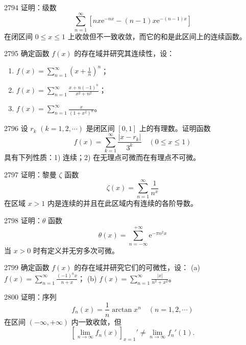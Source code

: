 \begin{prob}[M]{2794}
证明：级数
\[
\sum_{n=1}^{\infty} \left[ nx\mathrm{e}^{-nx} - (n-1)x\mathrm{e}^{-(n-1)x} \right]
\]
在闭区间 $0 \leqslant x \leqslant 1$ 上收敛但不一致收敛，而它的和是此区间上的连续函数。
\end{prob}

\begin{prob}[L]{2795}
确定函数 $f(x)$ 的存在域并研究其连续性，设：
\begin{enumerate}[label=(\alph*), itemsep=2pt, topsep=3pt]
  \item $\displaystyle f(x) = \sum_{n=1}^{\infty} \left(x + \frac{1}{n}\right)^n$；
  \item $\displaystyle f(x) = \sum_{n=1}^{\infty} \frac{x + n(-1)^n}{x^2 + n^2}$；
  \item $\displaystyle f(x) = \sum_{n=1}^{\infty} \frac{x}{(1 + x^2)^n}$。
\end{enumerate}
\end{prob}

\begin{prob}[M]{2796}
设 $r_k$ $(k=1,2,\cdots)$ 是闭区间 $[0,1]$ 上的有理数。证明函数
\[
f(x) = \sum_{k=1}^{\infty} \frac{|x - r_k|}{3^k} \quad (0 \leqslant x \leqslant 1)
\]
具有下列性质：1) 连续；2) 在无理点可微而在有理点不可微。
\end{prob}

\begin{prob}[M]{2797}
证明：黎曼 $\zeta$ 函数
\[
\zeta(x) = \sum_{n=1}^{\infty} \frac{1}{n^x}
\]
在区域 $x > 1$ 内是连续的并且在此区域内有连续的各阶导数。
\end{prob}

\begin{prob}[M]{2798}
证明：$\theta$ 函数
\[
\theta(x) = \sum_{n=-\infty}^{+\infty} \mathrm{e}^{-\pi n^2 x}
\]
当 $x > 0$ 时有定义并无穷多次可微。
\end{prob}

\begin{prob}[M]{2799}
确定函数 $f(x)$ 的存在域并研究它们的可微性，设：
(a) $\displaystyle f(x) = \sum_{n=1}^{\infty} \frac{(-1)^n x}{n+x}$； \qquad (b) $\displaystyle f(x) = \sum_{n=1}^{\infty} \frac{|x|}{n^2 + x^2}$。
\end{prob}

\begin{prob}[M]{2800}
证明：序列
\[
f_n(x) = \frac{1}{n}\arctan x^n \quad (n=1,2,\cdots)
\]
在区间 $(-\infty, +\infty)$ 内一致收敛，但
\[
\left[ \lim_{n\to\infty} f_n(x) \right]_{x=1}' \neq \lim_{n\to\infty} f_n'(1).
\]
\end{prob}

